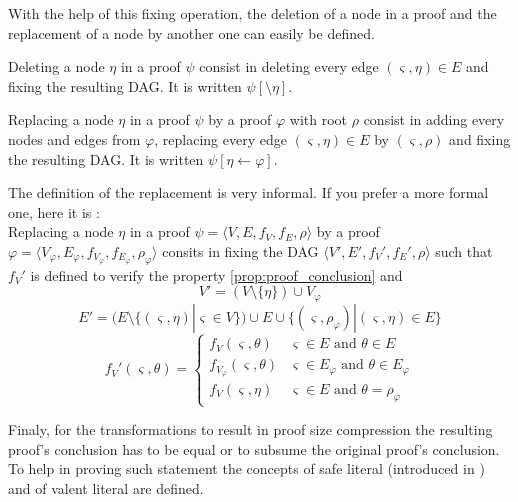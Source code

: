 \documentclass{llncs}
\begin{document}
With the help of this fixing operation, the deletion of a node in a proof and the replacement of a
node by another one can easily be defined.

\begin{definition}
Deleting a node $\eta$ in a proof $\psi$ consist in deleting every edge $(\varsigma,\eta) \in E$ and
fixing the resulting DAG. It is written $\psi[\setminus \eta]$.
\end{definition}

\begin{definition}
Replacing a node $\eta$ in a proof $\psi$ by a proof $\varphi$ with root $\rho$ consist in adding
every nodes and edges from $\varphi$, replacing every edge $(\varsigma,\eta) \in E$ by
$(\varsigma,\rho)$ and fixing the resulting DAG.  It is written $\psi[\eta \leftarrow \varphi]$.
\end{definition}

\begin{jb}
The definition of the replacement is very informal. If you prefer a more formal one, here it is :\\
Replacing a node $\eta$ in a proof $\psi = \langle V,E,f_V,f_E,\rho \rangle$ by a proof $\varphi =
\langle V_\varphi,E_\varphi,f_{V_\varphi},f_{E_\varphi},\rho_\varphi \rangle$ consits in fixing the DAG
$\langle V',E',f_V',f_E',\rho \rangle$ such that $f_V'$ is defined to verify the property
\ref{prop:proof_conclusion} and
\begin{equation*}
  V' = (V \setminus \{\eta\}) \cup V_\varphi
\end{equation*}
\begin{equation*}
  E' = (E \setminus \{(\varsigma,\eta)|\varsigma \in V\}) \cup E \cup
       \{(\varsigma,\rho_\varphi)|(\varsigma,\eta) \in E\}
\end{equation*}
\begin{equation*}
  f_V'(\varsigma,\theta) = \begin{cases}
    f_V(\varsigma,\theta) & \varsigma \in E \text{ and } \theta \in E \\
    f_{V_\varphi}(\varsigma,\theta) & \varsigma \in E_\varphi \text{ and } \theta \in E_\varphi \\
    f_V(\varsigma,\eta) & \varsigma \in E \text{ and } \theta = \rho_\varphi
  \end{cases}
\end{equation*}
\end{jb}

Finaly, for the transformations to result in proof size compression the resulting proof's conclusion
has to be equal or to subsume the original proof's conclusion. To help in proving such statement the
concepts of safe literal (introduced in \cite{RP}) and of valent literal are defined.
\end{document}
